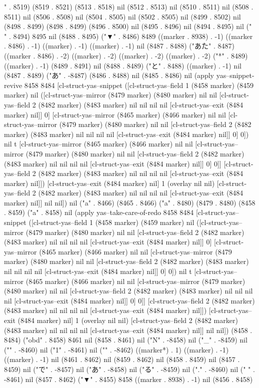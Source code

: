 " . 8519) (8519 . 8521) (8513 . 8518) nil (8512 . 8513) nil (8510 . 8511) nil (8508 . 8511) nil (8506 . 8508) nil (8504 . 8505) nil (8502 . 8505) nil (8499 . 8502) nil (8498 . 8499) (8498 . 8499) (8496 . 8500) nil (8495 . 8496) nil (8494 . 8495) nil (" " . 8494) 8495 nil (8488 . 8495) ("▼" . 8486) 8489 ((marker . 8938) . -1) ((marker . 8486) . -1) ((marker) . -1) ((marker) . -1) nil (8487 . 8488) ("あた" . 8487) ((marker . 8486) . -2) ((marker) . -2) ((marker) . -2) ((marker) . -2) ("*" . 8489) ((marker) . -1) (8489 . 8491) nil (8488 . 8489) ("と" . 8488) ((marker) . -1) nil (8487 . 8489) ("あ" . -8487) (8486 . 8488) nil (8485 . 8486) nil (apply yas--snippet-revive 8458 8484 [cl-struct-yas--snippet ([cl-struct-yas--field 1 (8458 marker) (8459 marker) nil ([cl-struct-yas--mirror (8479 marker) (8480 marker) nil nil [cl-struct-yas--field 2 (8482 marker) (8483 marker) nil nil nil nil [cl-struct-yas--exit (8484 marker) nil]] 0] [cl-struct-yas--mirror (8465 marker) (8466 marker) nil nil [cl-struct-yas--mirror (8479 marker) (8480 marker) nil nil [cl-struct-yas--field 2 (8482 marker) (8483 marker) nil nil nil nil [cl-struct-yas--exit (8484 marker) nil]] 0] 0]) nil t [cl-struct-yas--mirror (8465 marker) (8466 marker) nil nil [cl-struct-yas--mirror (8479 marker) (8480 marker) nil nil [cl-struct-yas--field 2 (8482 marker) (8483 marker) nil nil nil nil [cl-struct-yas--exit (8484 marker) nil]] 0] 0]] [cl-struct-yas--field 2 (8482 marker) (8483 marker) nil nil nil nil [cl-struct-yas--exit (8484 marker) nil]]) [cl-struct-yas--exit (8484 marker) nil] 1 (overlay nil nil) [cl-struct-yas--field 2 (8482 marker) (8483 marker) nil nil nil nil [cl-struct-yas--exit (8484 marker) nil]] nil nil]) nil ("a" . 8466) (8465 . 8466) ("a" . 8480) (8479 . 8480) (8458 . 8459) ("a" . 8458) nil (apply yas--take-care-of-redo 8458 8484 [cl-struct-yas--snippet ([cl-struct-yas--field 1 (8458 marker) (8459 marker) nil ([cl-struct-yas--mirror (8479 marker) (8480 marker) nil nil [cl-struct-yas--field 2 (8482 marker) (8483 marker) nil nil nil nil [cl-struct-yas--exit (8484 marker) nil]] 0] [cl-struct-yas--mirror (8465 marker) (8466 marker) nil nil [cl-struct-yas--mirror (8479 marker) (8480 marker) nil nil [cl-struct-yas--field 2 (8482 marker) (8483 marker) nil nil nil nil [cl-struct-yas--exit (8484 marker) nil]] 0] 0]) nil t [cl-struct-yas--mirror (8465 marker) (8466 marker) nil nil [cl-struct-yas--mirror (8479 marker) (8480 marker) nil nil [cl-struct-yas--field 2 (8482 marker) (8483 marker) nil nil nil nil [cl-struct-yas--exit (8484 marker) nil]] 0] 0]] [cl-struct-yas--field 2 (8482 marker) (8483 marker) nil nil nil nil [cl-struct-yas--exit (8484 marker) nil]]) [cl-struct-yas--exit (8484 marker) nil] 1 (overlay nil nil) [cl-struct-yas--field 2 (8482 marker) (8483 marker) nil nil nil nil [cl-struct-yas--exit (8484 marker) nil]] nil nil]) (8458 . 8484) ("obd" . 8458) 8461 nil (8458 . 8461) nil ("N" . -8458) nil ("_" . -8459) nil ("{" . -8460) nil ("1" . -8461) nil ("}" . -8462) ((marker*) . 1) ((marker) . -1) ((marker) . -1) nil (8461 . 8462) nil (8459 . 8462) nil (8458 . 8459) nil (8457 . 8459) nil ("で" . -8457) nil ("あ" . -8458) nil ("る" . -8459) nil ("." . -8460) nil (" " . -8461) nil (8457 . 8462) ("▼" . 8455) 8458 ((marker . 8938) . -1) nil (8456 . 8458) 